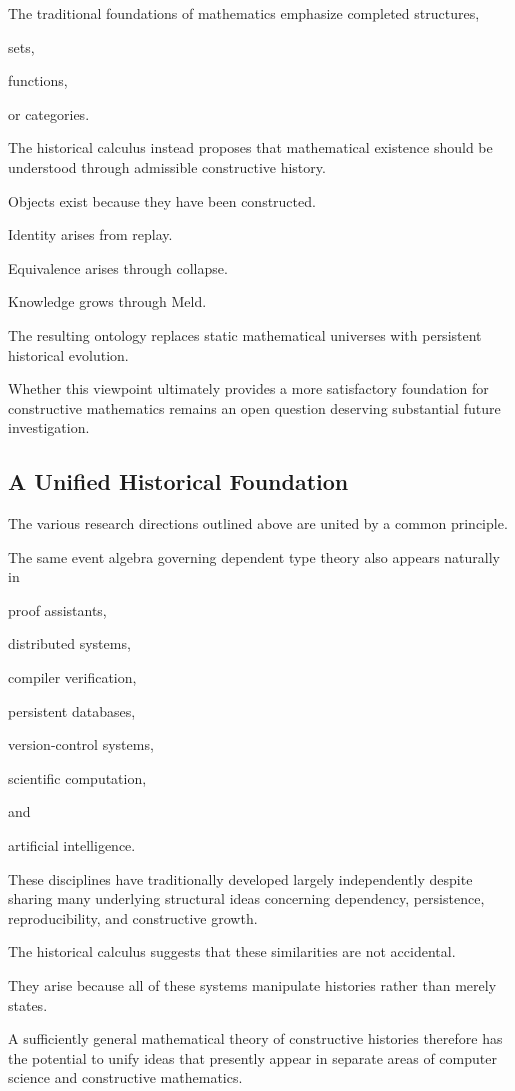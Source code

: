 \documentclass[12pt,oneside]{article}
\theoremstyle{definition}
\theoremstyle{remark}
\begin{document}
The traditional foundations of mathematics emphasize completed structures,

sets,

functions,

or categories.

The historical calculus instead proposes that mathematical existence should be
understood through admissible constructive history.

Objects exist because they have been constructed.

Identity arises from replay.

Equivalence arises through collapse.

Knowledge grows through Meld.

The resulting ontology replaces static mathematical universes with persistent
historical evolution.

Whether this viewpoint ultimately provides a more satisfactory foundation for
constructive mathematics remains an open question deserving substantial future
investigation.

\subsection{A Unified Historical Foundation}

The various research directions outlined above are united by a common principle.

The same event algebra governing dependent type theory also appears naturally in

proof assistants,

distributed systems,

compiler verification,

persistent databases,

version-control systems,

scientific computation,

and

artificial intelligence.

These disciplines have traditionally developed largely independently despite
sharing many underlying structural ideas concerning dependency, persistence,
reproducibility, and constructive growth.

The historical calculus suggests that these similarities are not accidental.

They arise because all of these systems manipulate histories rather than merely
states.

A sufficiently general mathematical theory of constructive histories therefore
has the potential to unify ideas that presently appear in separate areas of
computer science and constructive mathematics.
\end{document}
